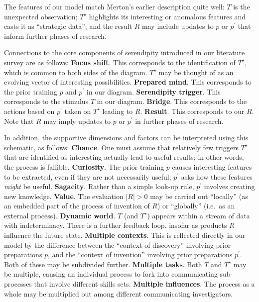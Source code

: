 
The features of our model match Merton's \citeyear{merton1948bearing} earlier description quite
well: $T$ is the unexpected observation; $T^\star$ highlights its
interesting or anomalous features and casts it as ``strategic data''; and the result $R$ may include
updates to $p$ or $p^{\prime}$ that inform further phases of research.  

Connections to the core components of serendipity introduced in our literature survey are as follows:
%
\textbf{Focus shift}. This corresponds to the identification of
$T^\star$, which is common to both sides of the diagram.
$T^\star$ may be thought of as an evolving vector of interesting
possibilities.
%
\textbf{Prepared mind}. This corresponds to the prior training $p$ and $p^{\prime}$ in our diagram.
%
\textbf{Serendipity trigger}. This corresponds to the stimulus $T$ in our diagram.
%
\textbf{Bridge}. This corresponds to the actions based on $p^{\prime}$ taken on
$T^\star$ leading to $R$.
%
\textbf{Result}. This corresponds to our $R$.  Note that $R$ may imply
  updates to $p$ or $p^{\prime}$ in further phases of research.

In addition, the supportive dimensions and factors can be interpreted using this schematic, as follows:
%
\textbf{Chance}. One must assume that relatively few triggers $T^\star$ that are
identified as interesting actually lead to useful results; in other
words, the process is fallible.
%
\textbf{Curiosity}. The prior training $p$ causes interesting features to be
  extracted, even if they are not necessarily useful; $p^{\prime}$
  asks how these features \emph{might} be useful.  
%
\textbf{Sagacity}. Rather than a simple look-up rule, $p^{\prime}$ involves creating new knowledge.
%
\textbf{Value}. The evaluation $|R|>0$ may be carried out ``locally'' (as
  an embedded part of the process of invention of $R$) or ``globally''
  (i.e.~as an external process).  
%
\textbf{Dynamic world}. $T$ (and $T^\star$) appears within a stream of data with
  indeterminacy.  There is a further feedback loop, insofar as
  products $R$ influence the future state.
%
\textbf{Multiple contexts}. This is reflected directly in our model by the difference
  between the ``context of discovery'' involving prior preparations
  $p$, and the ``context of invention'' involving prior preparations
  $p^{\prime}$.  Both of these may be subdivided further.
%
\textbf{Multiple tasks}. Both $T$ and $T^\star$ may be multiple, causing an
  individual process to fork into communicating sub-processes that
  involve different skills sets.
%
\textbf{Multiple influences}. The process as a whole may be multiplied out among
different communicating investigators.




